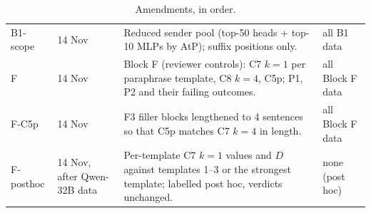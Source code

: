 \begin{table}[!htbp]
\begin{tabular}{@{}p{1.3cm}p{2.2cm}p{8.4cm}p{2.6cm}@{}}
B1-scope & 14 Nov & Reduced sender pool (top-50 heads + top-10 MLPs by AtP); suffix positions only. & all B1 data \\
F & 14 Nov & Block F (reviewer controls): C7 $k{=}1$ per paraphrase template, C8 $k{=}4$, C5p; P1, P2 and their failing outcomes. & all Block F data \\
F-C5p & 14 Nov & F3 filler blocks lengthened to 4 sentences so that C5p matches C7 $k{=}4$ in length. & all Block F data \\
F-posthoc & 14 Nov, after Qwen-32B data & Per-template C7 $k{=}1$ values and $D$ against templates 1--3 or the strongest template; labelled post hoc, verdicts unchanged. & none (post hoc) \\
\bottomrule\end{tabular}\caption{Amendments, in order.}\label{tab:amend}\end{table}
\clearpage
